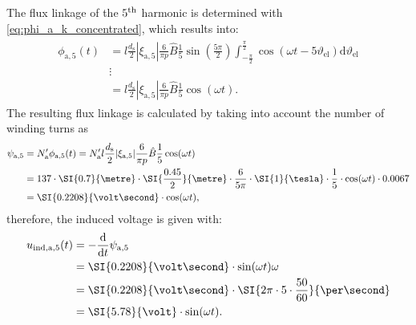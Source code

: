 \begin{solutionblock}
    The flux linkage of the $5\textsuperscript{th}$ harmonic is determined with \eqref{eq:phi_a_k_concentrated}, which results into:
    \begin{align}
        \begin{split}
            \phi_{\mathrm{a,}5}(t) &= l \frac{d_{\mathrm{s}}}{2} |\xi_{\mathrm{a},5}|
            \frac{6}{\pi p} \hat{B}\frac{1}{5} \sin\left(\frac{5\pi}{2}\right) \int_{-\frac{\pi}{2}}^{\frac{\pi}{2}} \cos(\omega t - 5\vartheta_{\mathrm{el}}) \mathrm{d}\vartheta_{\mathrm{el}} \\
            &  \vdots \\
            &= l \frac{d_{\mathrm{s}}}{2} |\xi_{\mathrm{a},5}|
            \frac{6}{\pi p} \hat{B} \frac{1}{5} \cos(\omega t).
        \end{split}
    \end{align}
    The resulting flux linkage is calculated by taking into account the number of winding turns as
    \begin{align}
        \begin{split}
            \psi_{\mathrm{a,}5} &= N_{\mathrm{a}}' \phi_{\mathrm{a,}5}(t) 
            = N_{\mathrm{a}}' l \frac{d_{\mathrm{s}}}{2} |\xi_{\mathrm{a},5}| \frac{6}{\pi p} \hat{B} \frac{1}{5} \cos(\omega t) \\
            &= 137 \cdot \SI{0.7}{\metre} \cdot \SI{\frac{0.45}{2}}{\metre} \cdot \frac{6}{5\pi} \cdot \SI{1}{\tesla} \cdot \frac{1}{5} \cdot \cos(\omega t) \cdot 0.0067 \\
            &= \SI{0.2208}{\volt\second} \cdot \cos(\omega t),
        \end{split}
    \end{align}
    therefore, the induced voltage is given with:
    \begin{align}
        \begin{split}
            u_{\mathrm{ind,a,}5}(t) &= -\frac{\mathrm{d}}{\mathrm{d}t}\psi_{\mathrm{a,}5} \\
            &= \SI{0.2208}{\volt\second} \cdot \sin(\omega t) \omega \\
            &= \SI{0.2208}{\volt\second} \cdot \SI{2\pi\cdot 5\cdot \frac{50}{60}}{\per\second} \\
            &= \SI{5.78}{\volt} \cdot \sin(\omega t).
        \end{split}
    \end{align}
    


\end{solutionblock}
